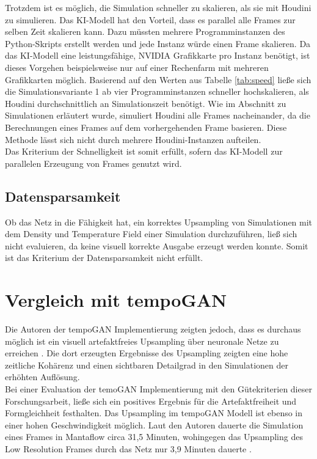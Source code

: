 Trotzdem ist es möglich, die Simulation schneller zu skalieren, als sie mit Houdini zu simulieren. Das KI-Modell hat den Vorteil, dass es parallel alle Frames zur selben Zeit skalieren kann. Dazu müssten mehrere Programminstanzen des Python-Skripts erstellt werden und jede Instanz würde einen Frame skalieren. Da das KI-Modell eine leistungsfähige, NVIDIA Grafikkarte pro Instanz benötigt, ist dieses Vorgehen beispielsweise nur auf einer Rechenfarm mit mehreren Grafikkarten möglich. Basierend auf den Werten aus Tabelle \ref{tab:speed} ließe sich die Simulationsvariante 1 ab vier Programminstanzen schneller hochskalieren, als Houdini durchschnittlich an Simulationszeit benötigt. Wie im Abschnitt zu Simulationen erläutert wurde, simuliert Houdini alle Frames nacheinander, da die Berechnungen eines Frames auf dem vorhergehenden Frame basieren. Diese Methode lässt sich nicht durch mehrere Houdini-Instanzen aufteilen.\\

Das Kriterium der Schnelligkeit ist somit erfüllt, sofern das KI-Modell zur parallelen Erzeugung von Frames genutzt wird.

\subsection{Datensparsamkeit}
Ob das Netz in die Fähigkeit hat, ein korrektes Upsampling von Simulationen mit dem Density und Temperature Field einer Simulation durchzuführen, ließ sich nicht evaluieren, da keine visuell korrekte Ausgabe erzeugt werden konnte. Somit ist das Kriterium der Datensparsamkeit nicht erfüllt.

\section{Vergleich mit tempoGAN}
Die Autoren der tempoGAN Implementierung zeigten jedoch, dass es durchaus möglich ist ein visuell artefaktfreies Upsampling über neuronale Netze zu erreichen \parencite[S. 95:10]{xie2018tempoGAN}. Die dort erzeugten Ergebnisse des Upsampling zeigten eine hohe zeitliche Kohärenz und einen sichtbaren Detailgrad in den Simulationen der erhöhten Auflösung.\\

Bei einer Evaluation der temoGAN Implementierung mit den Gütekriterien dieser Forschungsarbeit, ließe sich ein positives Ergebnis für die Artefaktfreiheit und Formgleichheit festhalten. Das Upsampling im tempoGAN Modell ist ebenso in einer hohen Geschwindigkeit möglich. Laut den Autoren dauerte die Simulation eines Frames in Mantaflow circa 31,5 Minuten, wohingegen das Upsampling des Low Resolution Frames durch das Netz nur 3,9 Minuten dauerte \parencite[S. 95:13]{xie2018tempoGAN}. \\

